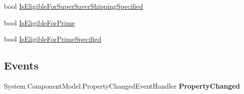 \begin{DoxyCompactItemize}
\begin{DoxyCompactList}\small\item\em \end{DoxyCompactList}\item 
\hypertarget{class_price___comparison_1_1amazon_1_1ecs_1_1_offer_listing_accfd81b66c90db31cb1a14d7f7ee9a07}{bool \hyperlink{class_price___comparison_1_1amazon_1_1ecs_1_1_offer_listing_accfd81b66c90db31cb1a14d7f7ee9a07}{Is\-Eligible\-For\-Super\-Saver\-Shipping\-Specified}}\label{class_price___comparison_1_1amazon_1_1ecs_1_1_offer_listing_accfd81b66c90db31cb1a14d7f7ee9a07}

\begin{DoxyCompactList}\small\item\em \end{DoxyCompactList}\item 
\hypertarget{class_price___comparison_1_1amazon_1_1ecs_1_1_offer_listing_a925d31ab574a578c49bad670bc91444e}{bool \hyperlink{class_price___comparison_1_1amazon_1_1ecs_1_1_offer_listing_a925d31ab574a578c49bad670bc91444e}{Is\-Eligible\-For\-Prime}}\label{class_price___comparison_1_1amazon_1_1ecs_1_1_offer_listing_a925d31ab574a578c49bad670bc91444e}

\begin{DoxyCompactList}\small\item\em \end{DoxyCompactList}\item 
\hypertarget{class_price___comparison_1_1amazon_1_1ecs_1_1_offer_listing_afd93201489858133851d911006938f5d}{bool \hyperlink{class_price___comparison_1_1amazon_1_1ecs_1_1_offer_listing_afd93201489858133851d911006938f5d}{Is\-Eligible\-For\-Prime\-Specified}}\label{class_price___comparison_1_1amazon_1_1ecs_1_1_offer_listing_afd93201489858133851d911006938f5d}

\begin{DoxyCompactList}\small\item\em \end{DoxyCompactList}\end{DoxyCompactItemize}
\subsection*{Events}
\begin{DoxyCompactItemize}
\item 
\hypertarget{class_price___comparison_1_1amazon_1_1ecs_1_1_offer_listing_a67b13c13c67463b7744be02cb1d8cbdd}{System.\-Component\-Model.\-Property\-Changed\-Event\-Handler {\bfseries Property\-Changed}}\label{class_price___comparison_1_1amazon_1_1ecs_1_1_offer_listing_a67b13c13c67463b7744be02cb1d8cbdd}

\end{DoxyCompactItemize}
